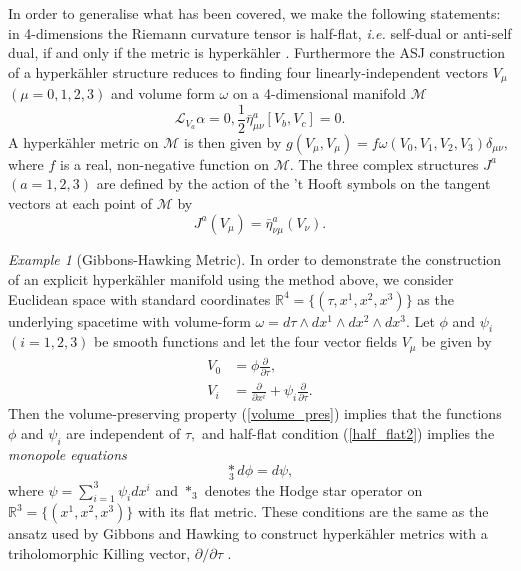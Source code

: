 \documentclass[a4paper,onecolumn,12pt]{article}
\theoremstyle{definition}
\theoremstyle{remark}
\newtheorem{ex}[thm]{Example}
\newcommand{\ie}{\emph{i.e.} }
\newcommand{\al}{\alpha}
\newcommand{\w}{\omega}
\newcommand{\m}{\mu}
\newcommand{\n}{\nu}
\newcommand{\ddt}[1]{\frac{\partial #1}{\partial \tau}}
\newcommand{\dd}[2]{\frac{\partial #1}{\partial #2}}
\newcommand{\HK}{hyperk\"ahler }
\newcommand{\x}[1]{x^{#1}}
\newcommand{\R}{\mathbb{R}}
\newcommand{\hooft}[3]{\bar{\eta}^{#1}_{#2 #3}}
\newcommand{\vol}{\w=d\tau\wedge dx^{1}\wedge dx^{2}\wedge dx^{3}}
\begin{document}
In order to generalise what has been covered, we make the following statements: in 4-dimensions the Riemann curvature tensor is half-flat, \ie self-dual or anti-self dual, if and only if the metric is \HK \cite{robinson_1988}. Furthermore the ASJ construction of a \HK structure reduces to finding four linearly-independent vectors $V_{\m}$ $(\m=0,1,2,3)$ and volume form $\w$ on a 4-dimensional manifold $\mathcal{M}$ \cite{ashtekar_1987,ashtekar_1988}
\begin{subequations}
	\begin{equation}
		\label{volume_pres}
		\mathcal{L}_{V_{a}}\al = 0,
	\end{equation}
	\begin{equation}
		\label{half_flat2}
		\frac{1}{2}\hooft{a}{\m}{\n}[V_{b},V_{c}] = 0.
	\end{equation}
\end{subequations}
A \HK metric on $\mathcal{M}$ is then given by $g(V_{\m},V_{\m})=f\w(V_{0},V_{1},V_{2},V_{3})\delta_{\m\n},$ where $f$ is a real, non-negative function on $\mathcal{M}.$ The three complex structures $J^{a}$ $(a=1,2,3)$ are defined by the action of the 't Hooft symbols on the tangent vectors at each point of $\mathcal{M}$ by
\begin{equation}
	J^{a}(V_{\m}) = \hooft{a}{\n}{\m}(V_{\n}).
\end{equation}
\begin{ex}[Gibbons-Hawking Metric]
	In order to demonstrate the construction of an explicit \HK manifold using the method above, we consider Euclidean space with standard coordinates $\R^{4} = \{(\tau,\x{1},\x{2},\x{3})\}$ as the underlying spacetime with volume-form $\vol$. Let $\phi$ and $\psi_{i}$ $(i=1,2,3)$ be smooth functions and let the four vector fields $V_{\mu}$ be given by
	\begin{subequations}
		\begin{align}
			V_{0} &= \phi\ddt{},\\
			V_{i} &= \dd{}{\x{i}} + \psi_{i}\ddt{}.
		\end{align}
	\end{subequations}
	Then the volume-preserving property (\ref{volume_pres}) implies that the functions $\phi$ and $\psi_{i}$ are independent of $\tau,$ and half-flat condition (\ref{half_flat2}) implies the \emph{monopole equations}
	\begin{equation}
		\underset{3}{\ast} d\phi = d\psi,
	\end{equation}
	where $\psi = \sum_{i=1}^{3}\psi_{i}d\x{i}$ and $\ast_{3}$ denotes the Hodge star operator on $\R^{3} = \{(\x{1},\x{2},\x{3})\}$ with its flat metric. These conditions are the same as the ansatz used by Gibbons and Hawking to construct \HK metrics with a triholomorphic Killing vector, $\partial/\partial\tau$ \cite{gibbons_1978}.
\end{ex}
\end{document}
